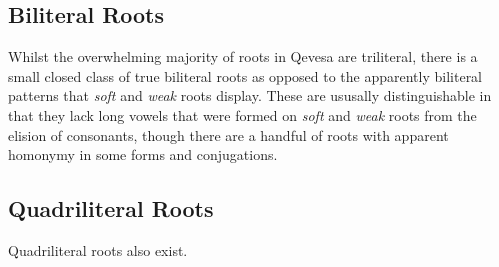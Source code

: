 \documentclass[grammar]{subfiles}
\begin{document}
  \subsection{Biliteral Roots}
  \label{ssec:vm_biliteral_roots}

  Whilst the overwhelming majority of roots in Qevesa are triliteral, there is
  a small closed class of true biliteral roots as opposed to the apparently
  biliteral patterns that \emph{soft} and \emph{weak} roots display.  These are
  ususally distinguishable in that they lack long vowels that were formed on
  \emph{soft} and \emph{weak} roots from the elision of consonants, though
  there are a handful of roots with apparent homonymy in some forms and
  conjugations.

  \subsection{Quadriliteral Roots}
  \label{ssec:vm_quadriliteral_roots}

  Quadriliteral roots also exist.

  \ToBeWritten
\end{document}
